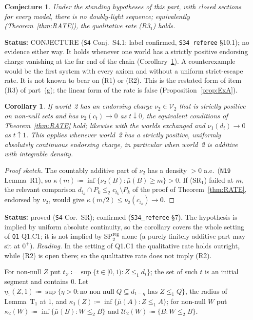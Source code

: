 \documentclass[11pt]{article}
\newtheorem{corollary}[theorem]{Corollary}
\newtheorem{conjecture}[theorem]{Conjecture}
\theoremstyle{definition}
\theoremstyle{remark}
\newcommand{\src}[1]{\texttt{#1}}
\newcommand{\status}[1]{\par\smallskip\noindent\textbf{Status:} #1\par\smallskip}
\begin{document}
\begin{conjecture}\label{conj:NDL}
Under the standing hypotheses of this part, with closed sections for every model, there is no doubly-light sequence; equivalently (Theorem~\ref{thm:RATE}), the qualitative rate (R3$_1$) holds.
\end{conjecture}
\status{CONJECTURE (\src{S4} Conj.~S4.1; label confirmed, \src{S34\_referee} \S10.1); no evidence either way. It holds whenever one world has a strictly positive endorsing charge vanishing at the far end of the chain (Corollary~\ref{cor:SR}). A counterexample would be the first system with every axiom and without a uniform strict-escape rate. It is not known to bear on (R1) or (R2). This is the restated form of item (R3) of part~(g); the linear form of the rate is false (Proposition~\ref{prop:ExA}).}

\begin{corollary}\label{cor:SR}
If world~2 has an endorsing charge $\nu_2\in\mathcal V_2$ that is strictly positive on non-null sets and has $\nu_2(c_t)\to0$ as $t\downarrow0$, the equivalent conditions of Theorem~\ref{thm:RATE} hold; likewise with the worlds exchanged and $\nu_1(d_t)\to0$ as $t\uparrow1$. This applies whenever world~2 has a strictly positive, uniformly absolutely continuous endorsing charge, in particular when world~2 is additive with integrable density.
\end{corollary}
\begin{proof}[Proof sketch]
The countably additive part of $\nu_2$ has a density $>0$ a.e.\ (\src{N19} Lemma~R1), so $\kappa(m)\coloneqq\inf\{\nu_2(B):\bar\mu(B)\ge m\}>0$. If (SR$_1$) failed at $m$, the relevant comparison $d_{t_k}\cap P_k\le_2c_{t_k}\setminus P_k$ of the proof of Theorem~\ref{thm:RATE}, endorsed by $\nu_2$, would give $\kappa(m/2)\le\nu_2(c_{t_k})\to0$.
\end{proof}
\status{proved (\src{S4} Cor.~SR); confirmed (\src{S34\_referee} \S7). The hypothesis is implied by uniform absolute continuity, so the corollary covers the whole setting of \src{Q1} Q1.C1; it is not implied by SP$^{\mathrm{reg}}_2$ alone (a purely finitely additive part may sit at $0^+$). \emph{Reading.} In the setting of Q1.C1 the qualitative rate holds outright, while (R2) is open there; so the qualitative rate does not imply (R2).}

For non-null $Z$ put $t_Z\coloneqq\sup\{t\in[0,1):Z\le_1d_t\}$; the set of such $t$ is an initial segment and contains $0$. Let $\eta_1(Z,1)\coloneqq\sup\{\eta>0:\text{no non-null }Q\subseteq d_{1-\eta}\text{ has }Z\le_1Q\}$, the radius of Lemma~T$_1$ at $1$, and $\kappa_1(Z)\coloneqq\inf\{\bar\mu(A):Z\le_1A\}$; for non-null $W$ put $\kappa_2(W)\coloneqq\inf\{\bar\mu(B):W\le_2B\}$ and $\mathcal U_2(W)\coloneqq\{B:W\le_2B\}$.
\end{document}

